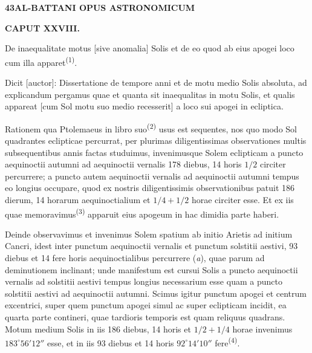 \documentclass[10pt,a4paper]{article}
\newcommand{\SP}[3]{%
  \clearpage
  \hypertarget{AB01-PDF#1}{}%
  \begin{center}
    \textbf{#2\quad #3}
  \end{center}%
}
\newcommand{\A}[1]{\hypertarget{#1}{}}
\newcommand{\NM}[1]{\textsuperscript{(#1)}}
\begin{document}

\SP{0132}{43}{AL-BATTANI OPUS ASTRONOMICUM}

\A{AB01-PDF0132-H01}
\begin{center}
\textbf{CAPUT XXVIII.}\par
De inaequalitate motus [sive anomalia] Solis et de eo quod
ab eius apogei loco cum illa apparet\NM{1}.
\end{center}

\A{AB01-PDF0132-P01}
Dicit [auctor]: Dissertatione de tempore anni et de motu medio
Solis absoluta, ad explicandum pergamus quae et quanta sit
inaequalitas in motu Solis, et qualis appareat [cum Sol motu suo
medio recesserit] a loco sui apogei in ecliptica.

\A{AB01-PDF0132-P02}
Rationem qua Ptolemaeus in libro suo\NM{2} usus est sequentes,
nos quo modo Sol quadrantes eclipticae percurrat, per plurimas
diligentissimas observationes multis subsequentibus annis factas
studuimus, invenimusque Solem eclipticam a puncto aequinoctii
autumni ad aequinoctii vernalis 178 diebus, 14 horis $1/2$
circiter percurrere; a puncto autem aequinoctii vernalis ad
aequinoctii autumni tempus eo longius occupare, quod ex nostris
diligentissimis observationibus patuit 186 dierum, 14 horarum
aequinoctialium et $1/4+1/2$ horae circiter esse. Et ex iis quae
memoravimus\NM{3} apparuit eius apogeum in hac dimidia parte haberi.

\A{AB01-PDF0132-P03}
Deinde observavimus et invenimus Solem spatium ab initio Arietis
ad initium Cancri, idest inter punctum aequinoctii vernalis et
punctum solstitii aestivi, 93 diebus et 14 fere horis
aequinoctialibus percurrere ({\itshape a}), quae parum ad deminutionem
inclinant; unde manifestum est cursui Solis a puncto aequinoctii
vernalis ad solstitii aestivi tempus longius necessarium esse
quam a puncto solstitii aestivi ad aequinoctii autumni.
Scimus igitur punctum apogei et centrum excentrici, super quem
punctum apogei simul ac super eclipticam incidit, ea quarta parte
contineri, quae tardioris temporis est quam reliquus quadrans.
Motum medium Solis in iis 186 diebus, 14 horis et $1/2+1/4$
horae invenimus $183^\circ56'12''$ esse, et in iis 93 diebus et
14 horis $92^\circ14'10''$ fere\NM{4}.
\end{document}
